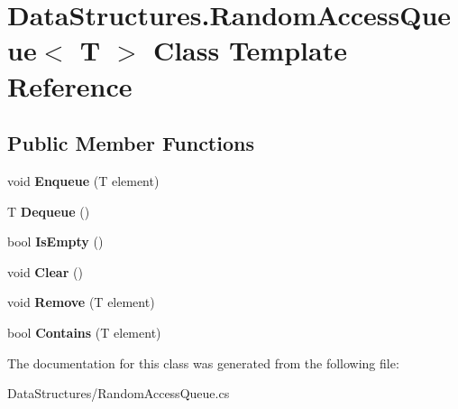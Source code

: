 \hypertarget{class_data_structures_1_1_random_access_queue}{}\section{Data\+Structures.\+Random\+Access\+Queue$<$ T $>$ Class Template Reference}
\label{class_data_structures_1_1_random_access_queue}
\subsection*{Public Member Functions}
\begin{DoxyCompactItemize}
\item 
\mbox{\label{class_data_structures_1_1_random_access_queue_a4596a5d2823e0bd998677cc66b2289ed}} 
void {\bfseries Enqueue} (T element)
\item 
\mbox{\label{class_data_structures_1_1_random_access_queue_a40ceaaa7ccd5cb960daaf2f7ae4cdb66}} 
T {\bfseries Dequeue} ()
\item 
\mbox{\label{class_data_structures_1_1_random_access_queue_a754cec5b81c1339d5050d89377a249a4}} 
bool {\bfseries Is\+Empty} ()
\item 
\mbox{\label{class_data_structures_1_1_random_access_queue_aea5da6dc093d903a3ed488a32147135e}} 
void {\bfseries Clear} ()
\item 
\mbox{\label{class_data_structures_1_1_random_access_queue_a8abf10e6b7f7c3cf7d8f50087c8f7b7f}} 
void {\bfseries Remove} (T element)
\item 
\mbox{\label{class_data_structures_1_1_random_access_queue_a25e36b80c04362e1e803e529165b7706}} 
bool {\bfseries Contains} (T element)
\end{DoxyCompactItemize}


The documentation for this class was generated from the following file\+:\begin{DoxyCompactItemize}
\item 
Data\+Structures/Random\+Access\+Queue.\+cs\end{DoxyCompactItemize}
